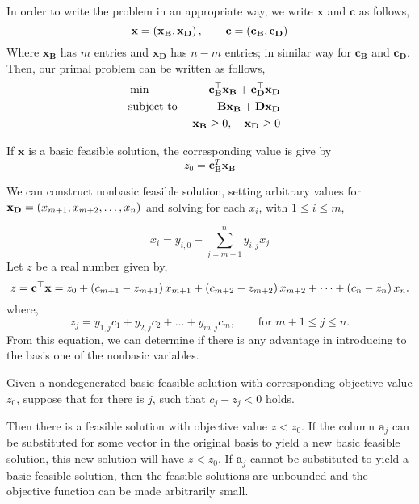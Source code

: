 In order to write the problem in an appropriate way, we write $\mathbf{x}$ and $\mathbf{c}$ as follows,
\begin{equation}
	\mathbf{x}=\left( \mathbf{x}_\mathbf{B}, \mathbf{x}_{\mathbf{D}} \right), \qquad \mathbf{c}=\left( \mathbf{c}_{\mathbf{B}}, \mathbf{c}_{\mathbf D} \right)
\end{equation}
Where $\mathbf{x}_{\mathbf{B}}$ has $m$ entries and $\mathbf{x}_{\mathbf{D}}$ has $n-m$ entries; in similar way for $\mathbf{c}_{\mathbf{B}}$ and $\mathbf{c}_{\mathbf D}$. Then, our primal problem can be written as follows,
\begin{align*}
	&\min &\mathbf{c}_{\mathbf{B}}^\top\mathbf{x}_{\mathbf{B}} + \mathbf{c}_\mathbf{D}^\top \mathbf{x}_\mathbf{D}&\\
	&\text{subject to }  &\mathbf{B}\mathbf{x}_{\mathbf{B}}+\mathbf{D}\mathbf{x}_{\mathbf{D}}& &\\
	& &\mathbf{x}_{\mathbf{B}}\geq 0, \quad \mathbf{x}_{\mathbf{D}}\geq 0 & &
\end{align*}


If $\mathbf{x}$ is a basic feasible solution, the corresponding value is give by
\begin{equation*}
	z_0=\mathbf{c}_{\mathbf{B}}^T\mathbf{x}_{\mathbf{B}}
\end{equation*}

We can construct nonbasic feasible solution, setting arbitrary values for $\mathbf{x}_{\mathbf{D}}=\left( x_{m+1}, x_{m+2},\dots, x_{n} \right)$ and solving for each $x_i$, with $1\leq i\leq m$,

\begin{equation*}
	x_i=y_{i,0}-\sum_{j=m+1}^{n} y_{i,j}x_{j}
\end{equation*}
Let $z$ be a real number given by,
\begin{equation}
	z=\mathbf{c}^\top \mathbf{x}=z_0+\left( c_{m+1}-z_{m+1} \right)x_{m+1}+\left( c_{m+2}-z_{m+2} \right)x_{m+2}+\dots+\left( c_{n}-z_{n} \right)x_{n}.  \label{eq: cost after pivot}
\end{equation}
where,
\begin{equation}
	z_{j}=y_{1,j}c_1+y_{2,j} c_2 +\dots +y_{m,j}c_{m}, \qquad \text{for } m+1\leq j\leq n. \label{eq: i cost after pivot}
\end{equation}
From this equation, we can determine if there is any advantage in introducing to the basis one of the nonbasic variables.
\begin{theorem}

Given a nondegenerated basic feasible solution with corresponding objective value $z_0$, suppose that for there is $j$, such that $c_j − z_j < 0$ holds. 

Then there is a feasible solution with objective value $z < z_0$. If the column $\mathbf{a}_j$ can be substituted for some vector in the original basis to yield a new basic feasible solution, this new solution will have $z<z_0$. If $\mathbf{a}_j$ cannot be substituted to yield a basic feasible solution, then the feasible solutions are unbounded and the objective function can be made arbitrarily small.
\end{theorem}



